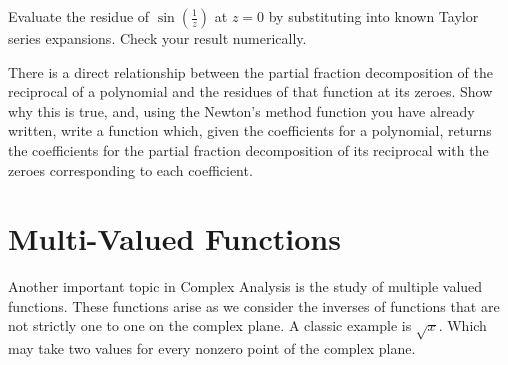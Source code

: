 \begin{problem}
Evaluate the residue of $\sin(\frac{1}{z})$ at $z=0$ by substituting into known Taylor series expansions. Check your result numerically.
\end{problem}

\begin{problem}
There is a direct relationship between the partial fraction decomposition of the reciprocal of a polynomial and the residues of that function at its zeroes. Show why this is true, and, using the Newton's method function you have already written, write a function which, given the coefficients for a polynomial, returns the coefficients for the partial fraction decomposition of its reciprocal with the zeroes corresponding to each coefficient.
\end{problem}
 
\section*{Multi-Valued Functions}

Another important topic in Complex Analysis is the study of multiple valued functions. These functions arise as we consider the inverses of functions that are not strictly one to one on the complex plane. A classic example is $\sqrt{x}$. Which may take two values for every nonzero point of the complex plane.


